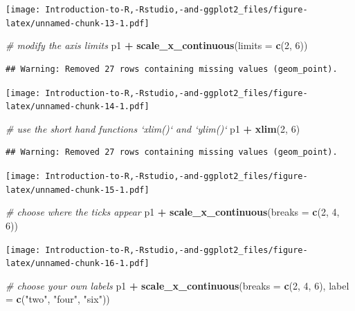 \documentclass[]{book}
\newenvironment{Shaded}{\begin{snugshade}}{\end{snugshade}}
\newcommand{\CommentTok}[1]{\textcolor[rgb]{0.56,0.35,0.01}{\textit{#1}}}
\newcommand{\DataTypeTok}[1]{\textcolor[rgb]{0.13,0.29,0.53}{#1}}
\newcommand{\DecValTok}[1]{\textcolor[rgb]{0.00,0.00,0.81}{#1}}
\newcommand{\KeywordTok}[1]{\textcolor[rgb]{0.13,0.29,0.53}{\textbf{#1}}}
\newcommand{\NormalTok}[1]{#1}
\newcommand{\OperatorTok}[1]{\textcolor[rgb]{0.81,0.36,0.00}{\textbf{#1}}}
\newcommand{\StringTok}[1]{\textcolor[rgb]{0.31,0.60,0.02}{#1}}
\begin{document}
\texttt{[image: Introduction-to-R,-Rstudio,-and-ggplot2\_files/figure-latex/unnamed-chunk-13-1.pdf]}

\begin{Shaded}
\begin{Highlighting}[]
\CommentTok{# modify the axis limits}
\NormalTok{p1 }\OperatorTok{+}\StringTok{ }\KeywordTok{scale_x_continuous}\NormalTok{(}\DataTypeTok{limits =} \KeywordTok{c}\NormalTok{(}\DecValTok{2}\NormalTok{, }\DecValTok{6}\NormalTok{))}
\end{Highlighting}
\end{Shaded}

\begin{verbatim}
## Warning: Removed 27 rows containing missing values (geom_point).
\end{verbatim}

\texttt{[image: Introduction-to-R,-Rstudio,-and-ggplot2\_files/figure-latex/unnamed-chunk-14-1.pdf]}

\begin{Shaded}
\begin{Highlighting}[]
\CommentTok{# use the short hand functions `xlim()` and `ylim()`}
\NormalTok{p1 }\OperatorTok{+}\StringTok{ }\KeywordTok{xlim}\NormalTok{(}\DecValTok{2}\NormalTok{, }\DecValTok{6}\NormalTok{)}
\end{Highlighting}
\end{Shaded}

\begin{verbatim}
## Warning: Removed 27 rows containing missing values (geom_point).
\end{verbatim}

\texttt{[image: Introduction-to-R,-Rstudio,-and-ggplot2\_files/figure-latex/unnamed-chunk-15-1.pdf]}

\begin{Shaded}
\begin{Highlighting}[]
\CommentTok{#  choose where the ticks appear}
\NormalTok{p1 }\OperatorTok{+}\StringTok{ }\KeywordTok{scale_x_continuous}\NormalTok{(}\DataTypeTok{breaks =} \KeywordTok{c}\NormalTok{(}\DecValTok{2}\NormalTok{, }\DecValTok{4}\NormalTok{, }\DecValTok{6}\NormalTok{))}
\end{Highlighting}
\end{Shaded}

\texttt{[image: Introduction-to-R,-Rstudio,-and-ggplot2\_files/figure-latex/unnamed-chunk-16-1.pdf]}

\begin{Shaded}
\begin{Highlighting}[]
\CommentTok{#  choose your own labels}
\NormalTok{p1 }\OperatorTok{+}\StringTok{ }\KeywordTok{scale_x_continuous}\NormalTok{(}\DataTypeTok{breaks =} \KeywordTok{c}\NormalTok{(}\DecValTok{2}\NormalTok{, }\DecValTok{4}\NormalTok{, }\DecValTok{6}\NormalTok{), }\DataTypeTok{label =} \KeywordTok{c}\NormalTok{(}\StringTok{"two"}\NormalTok{, }\StringTok{"four"}\NormalTok{, }\StringTok{"six"}\NormalTok{))}
\end{Highlighting}
\end{Shaded}
\end{document}
